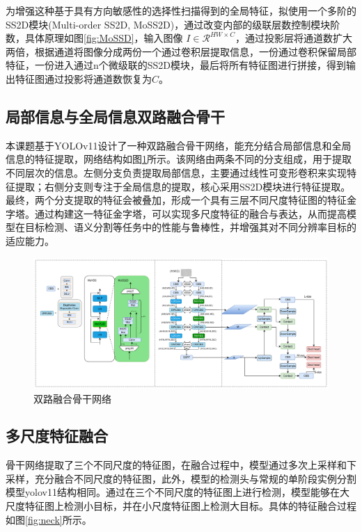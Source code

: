 \documentclass[UTF8,12pt, AutoFakeBold,fontset = founder]{ctexart}
\begin{document}
为增强这种基于具有方向敏感性的选择性扫描得到的全局特征，拟使用一个多阶的SS2D模块(Multi-order SS2D, MoSS2D)，通过改变内部的级联层数控制模块阶数，具体原理如图\ref{fig:MoSSD}，输入图像 $I \in \mathcal{R}^{HW \times C}$，通过投影层将通道数扩大两倍，根据通道将图像分成两份一个通过卷积层提取信息，一份通过卷积保留局部特征，一份进入通过n个微级联的SS2D模块，最后将所有特征图进行拼接，得到输出特征图通过投影将通道数恢复为$C$。

\subsection{局部信息与全局信息双路融合骨干}

本课题基于YOLOv11设计了一种双路融合骨干网络，能充分结合局部信息和全局信息的特征提取，网络结构如图\ref{fig:backbone}所示。该网络由两条不同的分支组成，用于提取不同层次的信息。左侧分支负责提取局部信息，主要通过线性可变形卷积来实现特征提取；右侧分支则专注于全局信息的提取，核心采用SS2D模块进行特征提取。最终，两个分支提取的特征会被叠加，形成一个具有三层不同尺度特征图的特征金字塔。通过构建这一特征金字塔，可以实现多尺度特征的融合与表达，从而提高模型在目标检测、语义分割等任务中的性能与鲁棒性，并增强其对不同分辨率目标的适应能力。

\begin{figure}[H]
    \centering
    \includegraphics[width=\textwidth]{../images/model.png}
    \caption{双路融合骨干网络}
    \label{fig:backbone}
\end{figure}

\subsection{多尺度特征融合}

骨干网络提取了三个不同尺度的特征图，在融合过程中，模型通过多次上采样和下采样，充分融合不同尺度的特征图，此外，模型的检测头与常规的单阶段实例分割模型yolov11结构相同。通过在三个不同尺度的特征图上进行检测，模型能够在大尺度特征图上检测小目标，并在小尺度特征图上检测大目标。具体的特征融合过程如图\ref{fig:neck}所示。
\end{document}
